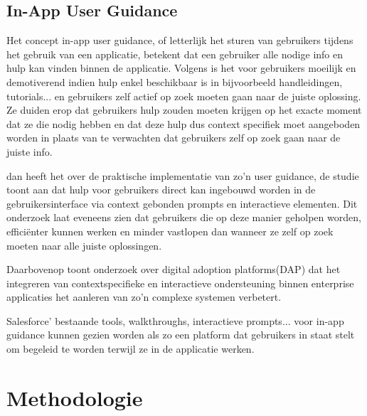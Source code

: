 \subsection{In-App User Guidance}
Het concept in-app user guidance, of letterlijk het sturen van gebruikers tijdens het gebruik van een applicatie, betekent dat een gebruiker alle nodige info en hulp kan vinden binnen de applicatie. Volgens \textcite{Acar2020} is het voor gebruikers moeilijk en demotiverend indien hulp enkel beschikbaar is in bijvoorbeeld handleidingen, tutorials... en gebruikers zelf actief op zoek moeten gaan naar de juiste oplossing. Ze duiden erop dat gebruikers hulp zouden moeten krijgen op het exacte moment dat ze die nodig hebben en dat deze hulp dus context specifiek moet aangeboden worden in plaats van te verwachten dat gebruikers zelf op zoek gaan naar de juiste info.

\textcite{Akiki2019} dan heeft het over de praktische implementatie van zo'n user guidance, de studie toont aan dat hulp voor gebruikers direct kan ingebouwd worden in de gebruikersinterface via context gebonden prompts en interactieve elementen. Dit onderzoek laat eveneens zien dat gebruikers die op deze manier geholpen worden, efficiënter kunnen werken en minder vastlopen dan wanneer ze zelf op zoek moeten naar alle juiste oplossingen.

Daarbovenop toont onderzoek over digital adoption platforms(DAP) dat het integreren van contextspecifieke en interactieve ondersteuning binnen enterprise applicaties het aanleren van zo'n complexe systemen verbetert.\autocite{Handrich2024}

Salesforce' bestaande tools, walkthroughs, interactieve prompts... voor in-app guidance kunnen gezien worden als zo een platform dat gebruikers in staat stelt om begeleid te worden terwijl ze in de applicatie werken.



\section{Methodologie}%
\label{sec:methodologie}


